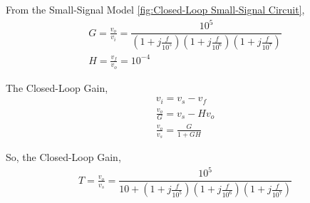\begin{enumerate}[label=\thesubsection.\arabic*.,ref=\thesubsection.\theenumi]
From the Small-Signal Model \ref{fig:Closed-Loop Small-Signal Circuit},
\begin{align}
G = \frac{v_{o}}{v_{i}} = \dfrac{10^5}{\left(1+j\frac{f}{10^{5}}\right)\left(1+j\frac{f}{10^{6}}\right)\left(1+j\frac{f}{10^{7}}\right)}\\
H = \frac{v_{f}}{v_{o}} = 10^{-4}
\end{align}

The Closed-Loop Gain,
\begin{align}
v_{i} = v_{s} - v_{f}\\
\frac{v_{o}}{G} = v_{s} - Hv_{o}\\
\frac{v_{o}}{v_{s}} = \frac{G}{1+GH}
\end{align}

So, the Closed-Loop Gain,
\begin{align}
T = \frac{v_{o}}{v_{s}} = \dfrac{10^5}{10 + \left(1+j\frac{f}{10^{5}}\right)\left(1+j\frac{f}{10^{6}}\right)\left(1+j\frac{f}{10^{7}}\right)}
\end{align}

\end{enumerate}

